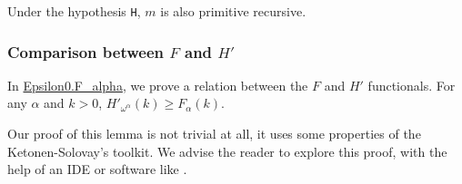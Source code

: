 

Under the hypothesis \texttt{H}, $m$ is also primitive recursive.




\subsubsection{Comparison between $F$ and $H'$}

In \href{../theories/html/hydras.Epsilon0.F_alpha.html}{Epsilon0.F\_alpha}, we prove a relation between the $F$ and $H'$ functionals. For any $\alpha$ and $k>0$,
$H'_{\omega^\alpha}(k)\geq F_\alpha(k)$.




Our proof of this lemma is not trivial at all, it uses some properties of the Ketonen-Solovay's toolkit. We advise the reader to explore this proof, with the help of an IDE or software like \alectr.









